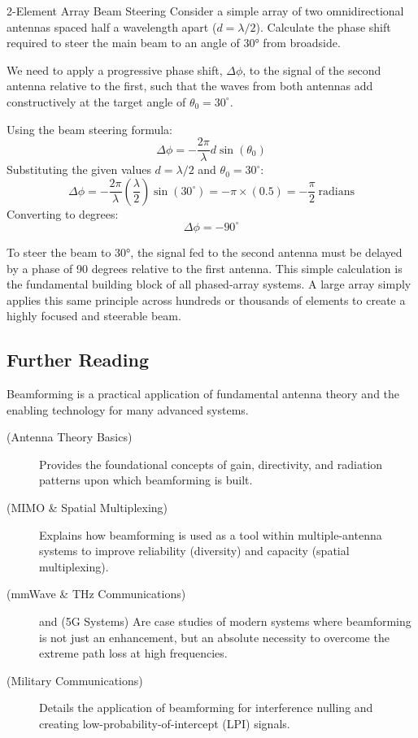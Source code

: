 \begin{workedexample}{2-Element Array Beam Steering}
    Consider a simple array of two omnidirectional antennas spaced half a wavelength apart (\(d = \lambda/2\)). Calculate the phase shift required to steer the main beam to an angle of 30° from broadside.

    We need to apply a progressive phase shift, \(\Delta\phi\), to the signal of the second antenna relative to the first, such that the waves from both antennas add constructively at the target angle of \(\theta_0 = 30^\circ\).
    
    Using the beam steering formula:
    \[ \Delta\phi = -\frac{2\pi}{\lambda} d \sin(\theta_0) \]
    Substituting the given values \(d = \lambda/2\) and \(\theta_0 = 30^\circ\):
    \[ \Delta\phi = -\frac{2\pi}{\lambda} \left(\frac{\lambda}{2}\right) \sin(30^\circ) = -\pi \times (0.5) = -\frac{\pi}{2}~\text{radians} \]
    Converting to degrees:
    \[ \Delta\phi = -90^\circ \]
    
    To steer the beam to 30°, the signal fed to the second antenna must be delayed by a phase of 90 degrees relative to the first antenna. This simple calculation is the fundamental building block of all phased-array systems. A large array simply applies this same principle across hundreds or thousands of elements to create a highly focused and steerable beam.
\end{workedexample}

\begin{importantbox}
\section*{Further Reading}
Beamforming is a practical application of fundamental antenna theory and the enabling technology for many advanced systems.
\begin{description}
    \item[ (Antenna Theory Basics)] Provides the foundational concepts of gain, directivity, and radiation patterns upon which beamforming is built.
    \item[ (MIMO \& Spatial Multiplexing)] Explains how beamforming is used as a tool within multiple-antenna systems to improve reliability (diversity) and capacity (spatial multiplexing).
    \item[ (mmWave \& THz Communications)] and  (5G Systems) Are case studies of modern systems where beamforming is not just an enhancement, but an absolute necessity to overcome the extreme path loss at high frequencies.
    \item[ (Military Communications)] Details the application of beamforming for interference nulling and creating low-probability-of-intercept (LPI) signals.
\end{description}
\end{importantbox}
